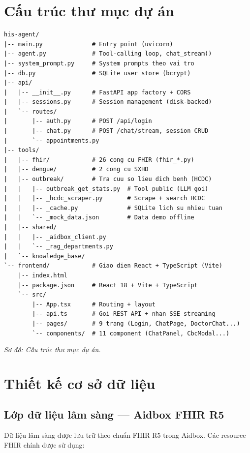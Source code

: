 \documentclass[a4paper,13pt,3p,twoside,openany]{report}
\theoremstyle{definition}
\theoremstyle{remark}
\theoremstyle{definition}
\let\ORIGsection\section
\let\ORIGsubsection\subsection
\renewcommand{\section}{\needspace{3\baselineskip}\ORIGsection}
\renewcommand{\subsection}{\needspace{3\baselineskip}\ORIGsubsection}
\begin{document}
\section{Cấu trúc thư mục dự án}

\begin{verbatim}
his-agent/
|-- main.py              # Entry point (uvicorn)
|-- agent.py             # Tool-calling loop, chat_stream()
|-- system_prompt.py     # System prompts theo vai tro
|-- db.py                # SQLite user store (bcrypt)
|-- api/
|   |-- __init__.py      # FastAPI app factory + CORS
|   |-- sessions.py      # Session management (disk-backed)
|   `-- routes/
|       |-- auth.py      # POST /api/login
|       |-- chat.py      # POST /chat/stream, session CRUD
|       `-- appointments.py
|-- tools/
|   |-- fhir/            # 26 cong cu FHIR (fhir_*.py)
|   |-- dengue/          # 2 cong cu SXHD
|   |-- outbreak/        # Tra cuu so lieu dich benh (HCDC)
|   |   |-- outbreak_get_stats.py  # Tool public (LLM goi)
|   |   |-- _hcdc_scraper.py       # Scrape + search HCDC
|   |   |-- _cache.py              # SQLite lich su nhieu tuan
|   |   `-- _mock_data.json        # Data demo offline
|   |-- shared/
|   |   |-- _aidbox_client.py
|   |   `-- _rag_departments.py
|   `-- knowledge_base/
`-- frontend/            # Giao dien React + TypeScript (Vite)
    |-- index.html
    |-- package.json     # React 18 + Vite + TypeScript
    `-- src/
        |-- App.tsx      # Routing + layout
        |-- api.ts       # Goi REST API + nhan SSE streaming
        |-- pages/       # 9 trang (Login, ChatPage, DoctorChat...)
        `-- components/  # 11 component (ChatPanel, CbcModal...)
\end{verbatim}
\textit{Sơ đồ: Cấu trúc thư mục dự án.}

\section{Thiết kế cơ sở dữ liệu}

\subsection{Lớp dữ liệu lâm sàng --- Aidbox FHIR R5}

Dữ liệu lâm sàng được lưu trữ theo chuẩn FHIR R5 trong Aidbox. Các resource FHIR chính được sử dụng:
\end{document}
